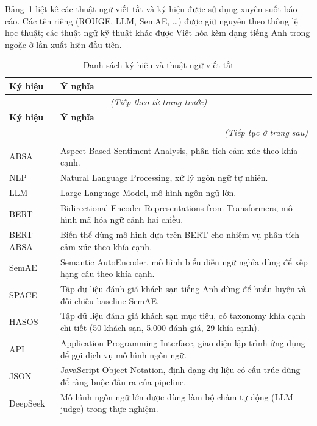 \documentclass[12pt,a4paper]{report}
\begin{document}
Bảng~\ref{tab:symbols} liệt kê các thuật ngữ viết tắt và ký hiệu được sử dụng xuyên suốt báo cáo. Các tên riêng (ROUGE, LLM, SemAE, \dots) được giữ nguyên theo thông lệ học thuật; các thuật ngữ kỹ thuật khác được Việt hóa kèm dạng tiếng Anh trong ngoặc ở lần xuất hiện đầu tiên.

\renewcommand{\arraystretch}{1.25}
\begin{longtable}{p{} p{}}
\caption{Danh sách ký hiệu và thuật ngữ viết tắt}\label{tab:symbols}\\
\toprule
\textbf{Ký hiệu} & \textbf{Ý nghĩa} \\
\midrule
\endfirsthead
\multicolumn{2}{c}{\textit{(Tiếp theo từ trang trước)}} \\
\toprule
\textbf{Ký hiệu} & \textbf{Ý nghĩa} \\
\midrule
\endhead
\midrule
\multicolumn{2}{r}{\textit{(Tiếp tục ở trang sau)}} \\
\endfoot
\bottomrule
\endlastfoot

\multicolumn{2}{l}{\textit{\textbf{Tên riêng và viết tắt}}} \\
\addlinespace[2pt]
ABSA & Aspect-Based Sentiment Analysis, phân tích cảm xúc theo khía cạnh. \\
NLP & Natural Language Processing, xử lý ngôn ngữ tự nhiên. \\
LLM & Large Language Model, mô hình ngôn ngữ lớn. \\
BERT & Bidirectional Encoder Representations from Transformers, mô hình mã hóa ngữ cảnh hai chiều. \\
BERT-ABSA & Biến thể dùng mô hình dựa trên BERT cho nhiệm vụ phân tích cảm xúc theo khía cạnh. \\
SemAE & Semantic AutoEncoder, mô hình biểu diễn ngữ nghĩa dùng để xếp hạng câu theo khía cạnh. \\
SPACE & Tập dữ liệu đánh giá khách sạn tiếng Anh dùng để huấn luyện và đối chiếu baseline SemAE. \\
HASOS & Tập dữ liệu đánh giá khách sạn mục tiêu, có taxonomy khía cạnh chi tiết (50 khách sạn, 5.000 đánh giá, 29 khía cạnh). \\
API & Application Programming Interface, giao diện lập trình ứng dụng để gọi dịch vụ mô hình ngôn ngữ. \\
JSON & JavaScript Object Notation, định dạng dữ liệu có cấu trúc dùng để ràng buộc đầu ra của pipeline. \\
DeepSeek & Mô hình ngôn ngữ lớn được dùng làm bộ chấm tự động (LLM judge) trong thực nghiệm. \\
\addlinespace[3pt]


\end{longtable}
\end{document}
